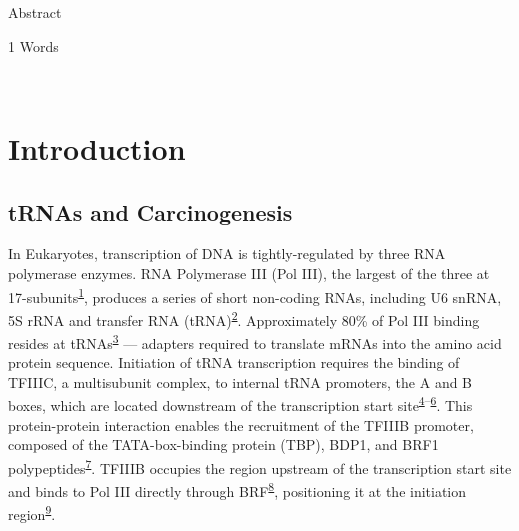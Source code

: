 \documentclass[
  12pt,
]{article}
\begin{document}
Abstract

\normalsize
\begin{flushright}
1 Words
\end{flushright}
\hrulefill\\
\setlength{\parindent}{10pt}

\hypertarget{introduction}{%
\section{Introduction}\label{introduction}}

\hypertarget{trnas-and-carcinogenesis}{%
\subsection{tRNAs and Carcinogenesis}\label{trnas-and-carcinogenesis}}

In Eukaryotes, transcription of DNA is tightly-regulated by three RNA polymerase enzymes.
RNA Polymerase III (Pol III), the largest of the three at 17-subunits\textsuperscript{\protect\hyperlink{ref-vannini2012}{1}}, produces a series of short non-coding RNAs, including U6 snRNA, 5S rRNA and transfer RNA (tRNA)\textsuperscript{\protect\hyperlink{ref-dieci2007}{2}}.
Approximately 80\% of Pol III binding resides at tRNAs\textsuperscript{\protect\hyperlink{ref-Raha2010a}{3}} --- adapters required to translate mRNAs into the amino acid protein sequence.
Initiation of tRNA transcription requires the binding of TFIIIC, a multisubunit complex, to internal tRNA promoters, the A and B boxes, which are located downstream of the transcription start site\textsuperscript{\protect\hyperlink{ref-Schramm2002}{4}--\protect\hyperlink{ref-Galli1981}{6}}.
This protein-protein interaction enables the recruitment of the TFIIIB promoter, composed of the TATA-box-binding protein (TBP), BDP1, and BRF1 polypeptides\textsuperscript{\protect\hyperlink{ref-schramm2000}{7}}.
TFIIIB occupies the region upstream of the transcription start site and binds to Pol III directly through BRF\textsuperscript{\protect\hyperlink{ref-Khoo1994}{8}}, positioning it at the initiation region\textsuperscript{\protect\hyperlink{ref-kassavetis1990}{9}}.
\end{document}
